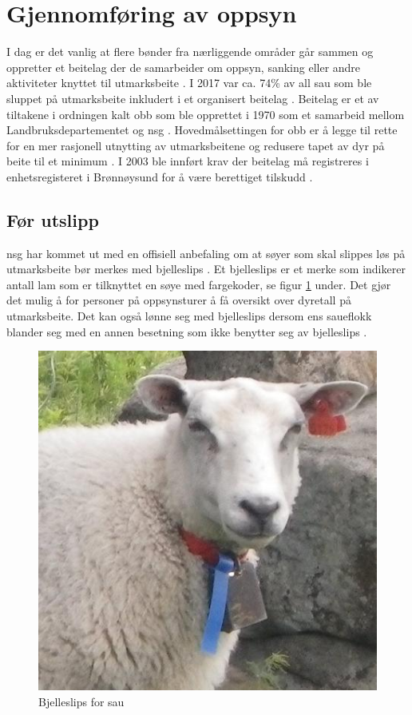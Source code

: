 \section{Gjennomføring av oppsyn}
I dag er det vanlig at flere bønder fra nærliggende områder går sammen og oppretter et beitelag der de samarbeider om oppsyn, sanking eller andre aktiviteter knyttet til utmarksbeite \cite[~s.57]{BungerSmafenaring2018}. I 2017 var ca. 74\% av all sau som ble sluppet på utmarksbeite inkludert i et organisert beitelag \cite{NorskSauogGeit2018OrganisertBeitebruk}. Beitelag er et av tiltakene i ordningen kalt \acrfull{obb} som ble opprettet i 1970 som et samarbeid mellom Landbruksdepartementet og \acrfull{nsg} \cite{NorskSauogGeit2018OrganisertBeitebruk}. Hovedmålsettingen for \acrshort{obb} er å legge til rette for en mer rasjonell utnytting av utmarksbeitene og redusere tapet av dyr på beite til et minimum \cite{NorskSauogGeit2018OrganisertBeitebruk}. I 2003 ble innført krav der beitelag må registreres i enhetsregisteret i Brønnøysund for å være berettiget tilskudd \cite{NorskSauogGeit2018OrganisertBeitebruk}.

\subsection{Før utslipp}
\acrshort{nsg} har kommet ut med en offisiell anbefaling om at søyer som skal slippes løs på utmarksbeite bør merkes med bjelleslips \cite{NorskSauogGeitBjelleslips}. Et bjelleslips er et merke som indikerer antall lam som er tilknyttet en søye med fargekoder, se figur \ref{fig:bjelleslips} under. Det gjør det mulig å for personer på oppsynsturer å få oversikt over dyretall på utmarksbeite. Det kan også lønne seg med bjelleslips dersom ens saueflokk blander seg med en annen besetning som ikke benytter seg av bjelleslips \cite[~s.27]{FylkesmanneniOsloogAkershus2017BeitedyrRovdyr}. 

\begin{figure}[H]
\centering
\includegraphics[scale=0.3]{Figurer/Bilder/bjelleslips.jpg}
\caption{Bjelleslips for sau}
\label{fig:bjelleslips}
\end{figure}

